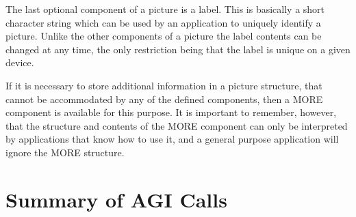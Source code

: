 The last optional component of a picture is a label. This is basically a
short character string which can be used by an application to uniquely
identify a picture. Unlike the other components of a picture the label
contents can be changed at any time, the only restriction being that
the label is unique on a given device.

If it is necessary to store additional information in a picture
structure, that cannot be accommodated by any of the defined components,
then a MORE component is available for this purpose. It is important to
remember, however, that the structure and contents of the MORE component
can only be interpreted by applications that know how to use it, and
a general purpose application will ignore the MORE structure.

\vspace*{4ex} %

\section {Summary of AGI Calls}

